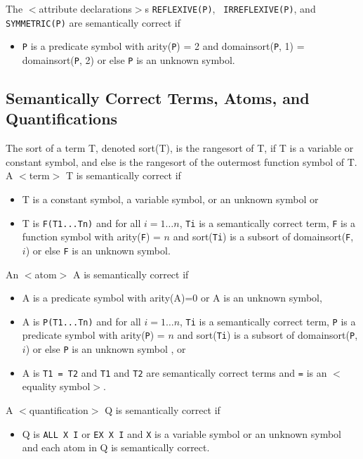 The $<$attribute declarations$>$s {\tt REFLEXIVE(P)}, {\tt
IRREFLEXIVE(P)}, and {\tt SYMMETRIC(P)} are semantically correct if

\begin{itemize}
\item {\tt P} is a predicate symbol with arity({\tt P}) = 2 and 
domainsort({\tt P}, 1) = domainsort({\tt P}, 2)  or else {\tt P} is an unknown symbol.
\end{itemize}



\subsection{Semantically Correct Terms, Atoms, and Quantifications}
\label{SemanticallyCorrectTermsAtomsandQuantifications}


The sort of a term T, denoted sort(T), is the rangesort of T, if T is a 
variable or constant symbol, and else is the rangesort of the outermost 
function symbol of T. 
A $<$term$>$ T is semantically correct if 
\begin{itemize}
\item T is a constant symbol, a variable symbol, or an unknown symbol
or
\item T is {\tt F(T1...Tn)} and for all $i=1\ldots n$, {\tt Ti} is a semantically correct term,
{\tt F} is a 	function symbol with arity({\tt F}) = $n$  and 
sort({\tt Ti}) is a subsort of domainsort({\tt F}, $i$)  or else {\tt F} is an 
unknown symbol.
\end{itemize}


An $<$atom$>$ A is semantically correct if 
\begin{itemize}
\item A is a predicate symbol with arity(A)=0  or A is an unknown 
symbol,
\item A is {\tt P(T1...Tn)} and for all $i=1\ldots n$, {\tt Ti} is a semantically correct term, {\tt P}
is a predicate symbol with arity({\tt P}) = $n$  and 
sort({\tt Ti}) is a subsort of domainsort({\tt P}, $i$)  or else {\tt P} is an 
unknown symbol , or
\item A is {\tt T1 = T2} and {\tt T1} and {\tt T2} are semantically 
correct terms and {\tt =} is an $<$equality symbol$>$. 
\end{itemize}



A $<$quantification$>$ Q is semantically correct if
\begin{itemize}
\item Q is {\tt ALL X I} or {\tt EX X I} and {\tt X} is a variable symbol or an unknown 
symbol and each atom in Q is semantically correct. 
\end{itemize}


